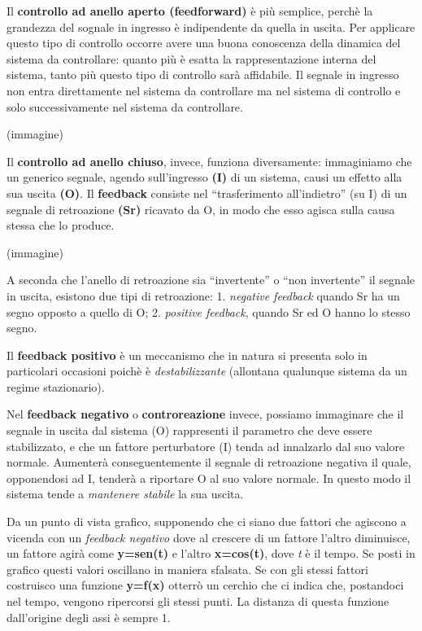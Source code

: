 \documentclass[]{article}
\begin{document}
Il \textbf{controllo ad anello aperto (feedforward)} è più semplice,
perchè la grandezza del sognale in ingresso è indipendente da quella in
uscita. Per applicare questo tipo di controllo occorre avere una buona
conoscenza della dinamica del sistema da controllare: quanto più è
esatta la rappresentazione interna del sistema, tanto più questo tipo di
controllo sarà affidabile. Il segnale in ingresso non entra direttamente
nel sistema da controllare ma nel sistema di controllo e solo
successivamente nel sistema da controllare.

(immagine)

Il \textbf{controllo ad anello chiuso}, invece, funziona diversamente:
immaginiamo che un generico segnale, agendo sull'ingresso \textbf{(I)}
di un sistema, causi un effetto alla sua uscita \textbf{(O)}. Il
\textbf{feedback} consiste nel ``trasferimento all'indietro'' (su I) di
un segnale di retroazione \textbf{(Sr)} ricavato da O, in modo che esso
agisca sulla causa stessa che lo produce.

(immagine)

A seconda che l'anello di retroazione sia ``invertente'' o ``non
invertente'' il segnale in uscita, esistono due tipi di retroazione: 1.
\emph{negative feedback} quando Sr ha un segno opposto a quello di O; 2.
\emph{positive feedback}, quando Sr ed O hanno lo stesso segno.

Il \textbf{feedback positivo} è un meccanismo che in natura si presenta
solo in particolari occasioni poichè è \emph{destabilizzante} (allontana
qualunque sistema da un regime stazionario).

Nel \textbf{feedback negativo} o \textbf{controreazione} invece,
possiamo immaginare che il segnale in uscita dal sistema (O) rappresenti
il parametro che deve essere stabilizzato, e che un fattore perturbatore
(I) tenda ad innalzarlo dal suo valore normale. Aumenterà
conseguentemente il segnale di retroazione negativa il quale,
opponendosi ad I, tenderà a riportare O al suo valore normale. In questo
modo il sistema tende a \emph{mantenere stabile} la sua uscita.

Da un punto di vista grafico, supponendo che ci siano due fattori che
agiscono a vicenda con un \emph{feedback negativo} dove al crescere di
un fattore l'altro diminuisce, un fattore agirà come \textbf{y=sen(t)} e
l'altro \textbf{x=cos(t)}, dove \emph{t} è il tempo. Se posti in grafico
questi valori oscillano in maniera sfalsata. Se con gli stessi fattori
costruisco una funzione \textbf{y=f(x)} otterrò un cerchio che ci indica
che, postandoci nel tempo, vengono ripercorsi gli stessi punti. La
distanza di questa funzione dall'origine degli assi è sempre 1.
\end{document}
